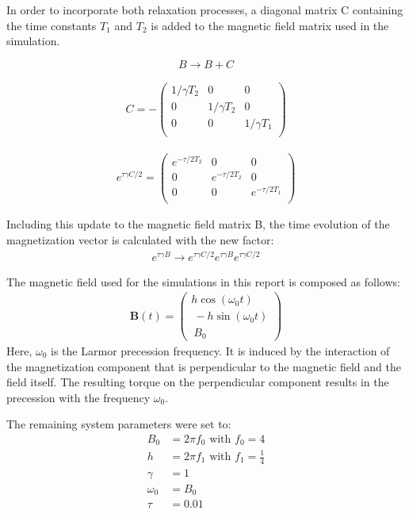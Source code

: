 \documentclass[journal]{IEEEtran} %
\begin{document}
In order to incorporate both relaxation processes, a diagonal matrix C containing the time constants $T_1$ and $T_2$ is added to the magnetic field matrix used in the simulation.

\begin{equation}
    B \rightarrow B + C
\end{equation}

\begin{align}
C = -
\begin{pmatrix}
1/\gamma T_2 & 0 & 0  \\
0 & 1/\gamma T_2 & 0 \\
0 & 0 & 1/\gamma T_1 \\
\end{pmatrix}
\end{align}

\begin{align}
e^{\tau\gamma C/2} = 
\begin{pmatrix}
e^{-\tau/2 T_2} & 0 & 0  \\
0 & e^{-\tau/2 T_2} & 0 \\
0 & 0 & e^{-\tau/2 T_1} \\
\end{pmatrix}
\end{align}

Including this update to the magnetic field matrix B, the time evolution of the magnetization vector is calculated with the new factor:
\begin{align}
    e^{\tau \gamma B} \longrightarrow e^{\tau \gamma C/2} e^{\tau \gamma B} e^{\tau \gamma C/2} 
\end{align}

The magnetic field used for the simulations in this report is composed as follows:
\begin{align}
\mathbf{B}(t) = \begin{pmatrix}h \cos(\omega_0 t) \\\ -h \sin(\omega_0 t) \\\ B_0 \end{pmatrix}    
\end{align}
Here, $\omega_0$ is the Larmor precession frequency. It is induced by the interaction of the magnetization component that is perpendicular to the magnetic field and the field itself. The resulting torque on the perpendicular component results in the precession with the frequency $\omega_0$.

The remaining system parameters were set to:
\begin{align*}
    B_0 &= 2 \pi f_0 \,\,\text{with}\,\, f_0 = 4 \\
    h &= 2 \pi f_1 \,\, \text{with}\,\, f_1 = \frac{1}{4}\\
    \gamma &= 1 \\
    \omega_0 &= B_0 \\
    \tau &= 0.01
\end{align*}
\end{document}
